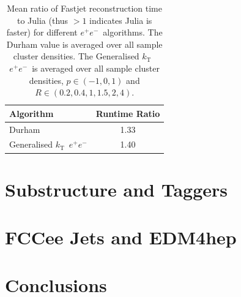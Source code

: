 \documentclass{webofc}
\newcommand{\kt}{${k}_\text{T}$}
\newcommand{\ee}{$e^+e^-$}
\begin{document}
\begin{table}[h]
    \begin{center}
        \begin{tabular}{l|c}
            \textbf{Algorithm} & \textbf{Runtime Ratio} \\
            \hline
            Durham & 1.33 \\
            Generalised \kt\ \ee & 1.40 \\
        \end{tabular}
        \caption{Mean ratio of Fastjet reconstruction time to Julia (thus $>1$ indicates Julia is faster) for different \ee\ algorithms. The Durham value is averaged over all sample cluster densities. The Generalised \kt\ \ee\ is averaged over all sample cluster densities, $p \in (-1, 0, 1)$ and $R \in (0.2, 0.4, 1, 1.5, 2, 4)$.}
        \label{tab:eeratios}
    \end{center}
\end{table}

\section{Substructure and Taggers}
\label{sec:sstag}



\section{FCCee Jets and EDM4hep}
\label{sec:fccee}

\section{Conclusions}
\label{sec:conclusions}

\sloppy
\raggedright

\end{document}
